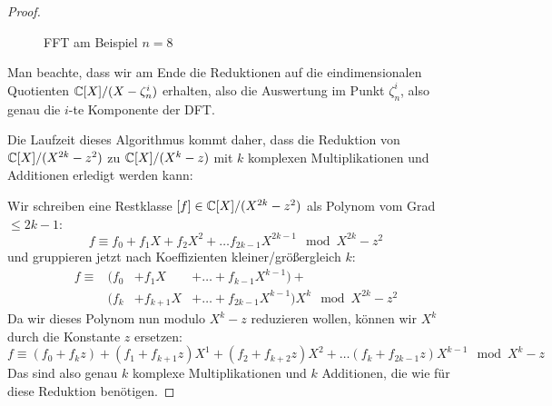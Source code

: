 \begin{proof}
    \begin{figure}[hpt]
        \caption{FFT am Beispiel $n=8$}
        \label{fig:fft:example_n_equals_8}
    \end{figure}

    Man beachte, dass wir am Ende die Reduktionen auf die eindimensionalen Quotienten $\mathbb{C}[X]/(X - \zeta_n^i)$ erhalten, also die Auswertung im Punkt $\zeta_n^i$, also genau die $i$-te Komponente der DFT\@.

    \medskip
    Die Laufzeit dieses Algorithmus kommt daher, dass die Reduktion von $\mathbb{C}[X]/(X^{2k}-z^2)$ zu $\mathbb{C}[X]/(X^k-z)$ mit $k$ komplexen Multiplikationen und Additionen erledigt werden kann:

    Wir schreiben eine Restklasse $[f] \in \mathbb{C}[X]/(X^{2k}-z^2)$ als Polynom vom Grad $\leq 2k-1$:
    \[f \equiv f_0 + f_1 X + f_2 X^2 + \ldots f_{2k-1}X^{2k-1} \mod X^{2k}-z^2\]
    und gruppieren jetzt nach Koeffizienten kleiner/größergleich $k$:
    \begin{align*}
        f \equiv & (f_0     &+ f_1 X      &+ \ldots + f_{k-1}X^{k-1}) + \\
        & (f_k &+ f_{k+1}X &+ \ldots + f_{2k-1}X^{k-1})X^k \mod X^{2k}-z^2
    \end{align*}
    Da wir dieses Polynom nun modulo $X^k-z$ reduzieren wollen, können wir $X^k$ durch die Konstante $z$ ersetzen:
    \[f \equiv (f_0+f_k z) + (f_1+f_{k+1}z)X^1+(f_2+f_{k+2}z)X^2 + \ldots (f_{k}+f_{2k-1}z)X^{k-1} \mod X^k-z\]
    Das sind also genau $k$ komplexe Multiplikationen und $k$ Additionen, die wie für diese Reduktion benötigen.


\end{proof}
